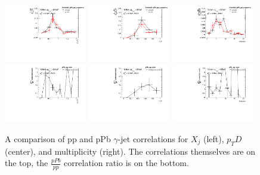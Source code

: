 \begin{figure}
    \centering
    \includegraphics[width=0.32\textwidth]{GammaJet/pp_pPb_correlations/hadj_XjLambda0_pPb_pp_comparison_Comparison.pdf}
    \includegraphics[width=0.32\textwidth]{GammaJet/pp_pPb_correlations/hadj_pTDLambda0_pPb_pp_comparison_Comparison.pdf}
    \includegraphics[width=0.32\textwidth]{GammaJet/pp_pPb_correlations/hadj_MultiplicityLambda0_pPb_pp_comparison_Comparison.pdf} \\
    \includegraphics[width=0.32\textwidth]{GammaJet/pp_pPb_correlations/hadj_Xj_ratiopPb_pp_ratio_Comparison.pdf}
    \includegraphics[width=0.32\textwidth]{GammaJet/pp_pPb_correlations/hadj_pTD_ratiopPb_pp_ratio_Comparison.pdf}
    \includegraphics[width=0.32\textwidth]{GammaJet/pp_pPb_correlations/hadj_Multiplicity_ratiopPb_pp_ratio_Comparison.pdf}
    \caption{A comparison of pp and pPb $\gamma$-jet correlations for $X_j$ (left), $p_TD$ (center), and multiplicity (right). The correlations themselves are on the top, the $\frac{pPb}{pp}$ correlation ratio is on the bottom.}
    \label{fig:other_obs_data}
\end{figure}

